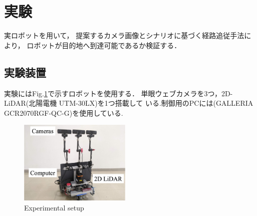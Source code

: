 \documentclass{sice-si}
\begin{document}
\section{実験}
実ロボットを用いて，
提案するカメラ画像とシナリオに基づく経路追従手法により，
ロボットが目的地へ到達可能であるか検証する．
\subsection{実験装置}
実験にはFig.\ref{fig:gamma}で示すロボットを使用する．
単眼ウェブカメラを3つ，2D-LiDAR(北陽電機 UTM-30LX)を1つ搭載して
いる.制御用のPCには(GALLERIA GCR2070RGF-QC-G)を使用している.
\begin{figure}[t]
    \centering
     \includegraphics[height=40mm]{./figs/gamma_sensor.png}
     \caption{Experimental setup}\label{fig:gamma}
\end{figure}
\end{document}
